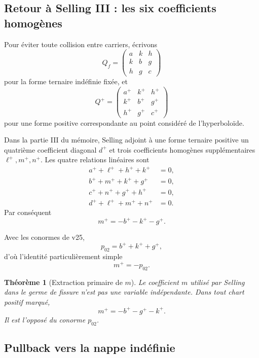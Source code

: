 \documentclass[11pt,a4paper]{article}
\newtheorem{theorem}{Théorème}[section]
\begin{document}
\subsection{Retour à Selling III : les six coefficients homogènes}

Pour éviter toute collision entre carriers, écrivons
\[
 Q_f=
 \begin{pmatrix}
 a&k&h\\
 k&b&g\\
 h&g&c
 \end{pmatrix}
\]
pour la forme ternaire indéfinie fixée, et
\[
 Q^+=
 \begin{pmatrix}
 a^+&k^+&h^+\\
 k^+&b^+&g^+\\
 h^+&g^+&c^+
 \end{pmatrix}
\]
pour une forme positive correspondante au point considéré de l'hyperboloïde.

Dans la partie III du mémoire, Selling adjoint à une forme ternaire positive un quatrième coefficient diagonal $d^+$ et trois coefficients homogènes supplémentaires $\ell^+,m^+,n^+$. Les quatre relations linéaires sont
\begin{equation}\label{eq:v26-selling-homogeneous-relations}
 \boxed{
 \begin{aligned}
 a^++\ell^++h^++k^+&=0,\\
 b^++m^++k^++g^+&=0,\\
 c^++n^++g^++h^+&=0,\\
 d^++\ell^++m^++n^+&=0.
 \end{aligned}}
\end{equation}
Par conséquent
\begin{equation}\label{eq:v26-m-positive}
 \boxed{
 m^+=-b^+-k^+-g^+.}
\end{equation}

Avec les conormes de v25,
\[
 p_{02}=b^++k^++g^+,
\]
d'où l'identité particulièrement simple
\begin{equation}\label{eq:v26-m-conorm}
 \boxed{m^+=-p_{02}.}
\end{equation}

\begin{theorem}[Extraction primaire de $m$]\label{thm:v26-m-extraction}
Le coefficient $m$ utilisé par Selling dans le germe de fissure n'est pas une variable indépendante. Dans tout chart positif marqué,
\[
 \boxed{m^+=-b^+-g^+-k^+.}
\]
Il est l'opposé du conorme $p_{02}$.
\end{theorem}

\subsection{Pullback vers la nappe indéfinie}
\end{document}
